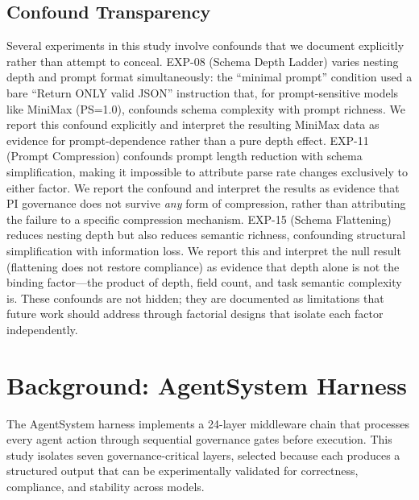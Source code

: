 \documentclass[11pt,a4paper]{article}
\begin{document}
\subsection{Confound Transparency}

Several experiments in this study involve confounds that we document explicitly rather than attempt to conceal. EXP-08 (Schema Depth Ladder) varies nesting depth and prompt format simultaneously: the ``minimal prompt'' condition used a bare ``Return ONLY valid JSON'' instruction that, for prompt-sensitive models like MiniMax (PS=1.0), confounds schema complexity with prompt richness. We report this confound explicitly and interpret the resulting MiniMax data as evidence for prompt-dependence rather than a pure depth effect. EXP-11 (Prompt Compression) confounds prompt length reduction with schema simplification, making it impossible to attribute parse rate changes exclusively to either factor. We report the confound and interpret the results as evidence that PI governance does not survive \textit{any} form of compression, rather than attributing the failure to a specific compression mechanism. EXP-15 (Schema Flattening) reduces nesting depth but also reduces semantic richness, confounding structural simplification with information loss. We report this and interpret the null result (flattening does not restore compliance) as evidence that depth alone is not the binding factor---the product of depth, field count, and task semantic complexity is. These confounds are not hidden; they are documented as limitations that future work should address through factorial designs that isolate each factor independently.

\section{Background: AgentSystem Harness}

The AgentSystem harness implements a 24-layer middleware chain that processes every agent action through sequential governance gates before execution. This study isolates seven governance-critical layers, selected because each produces a structured output that can be experimentally validated for correctness, compliance, and stability across models.
\end{document}
